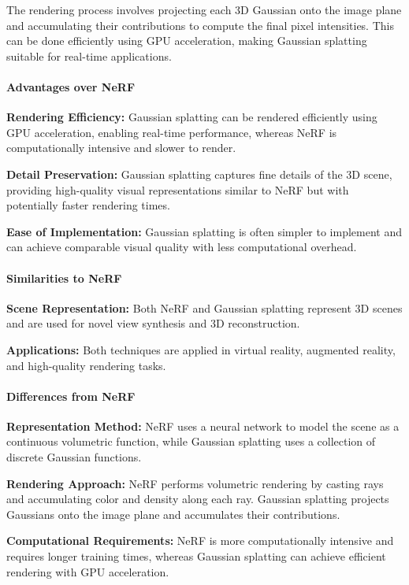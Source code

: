 \documentclass[12pt]{article}
\begin{document}
The rendering process involves projecting each 3D Gaussian onto the image plane and accumulating their contributions to compute the final pixel intensities. This can be done efficiently using GPU acceleration, making Gaussian splatting suitable for real-time applications.

\paragraph{Advantages over NeRF}

\textbf{Rendering Efficiency:} Gaussian splatting can be rendered efficiently using GPU acceleration, enabling real-time performance, whereas NeRF is computationally intensive and slower to render.

\textbf{Detail Preservation:} Gaussian splatting captures fine details of the 3D scene, providing high-quality visual representations similar to NeRF but with potentially faster rendering times.

\textbf{Ease of Implementation:} Gaussian splatting is often simpler to implement and can achieve comparable visual quality with less computational overhead.

\paragraph{Similarities to NeRF}

\textbf{Scene Representation:} Both NeRF and Gaussian splatting represent 3D scenes and are used for novel view synthesis and 3D reconstruction.

\textbf{Applications:} Both techniques are applied in virtual reality, augmented reality, and high-quality rendering tasks.

\paragraph{Differences from NeRF}

\textbf{Representation Method:} NeRF uses a neural network to model the scene as a continuous volumetric function, while Gaussian splatting uses a collection of discrete Gaussian functions.

\textbf{Rendering Approach:} NeRF performs volumetric rendering by casting rays and accumulating color and density along each ray. Gaussian splatting projects Gaussians onto the image plane and accumulates their contributions.

\textbf{Computational Requirements:} NeRF is more computationally intensive and requires longer training times, whereas Gaussian splatting can achieve efficient rendering with GPU acceleration.
\end{document}
